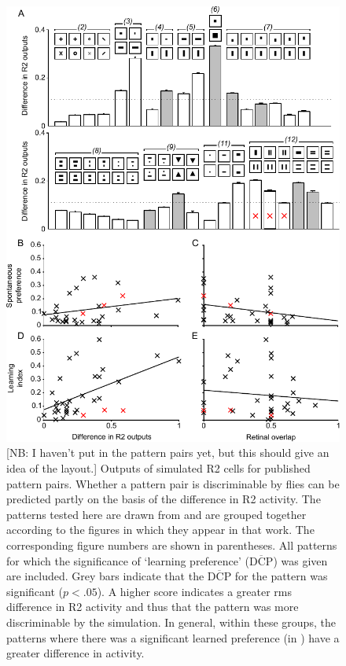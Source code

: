 \begin{figure}
\vspace{-1cm}
\centering
\includegraphics{figures/pattern}
\caption{[NB: I haven't put in the pattern pairs yet, but this should give an idea of the layout.]
Outputs of simulated R2 cells for published pattern pairs. Whether a pattern pair is discriminable by flies can be predicted partly on the basis of the difference in R2 activity.
The patterns tested here are drawn from \protect\cite{Ernst1999} and are grouped together according to the figures in which they appear in that work.
The corresponding figure numbers are shown in parentheses.
All patterns for which the significance of `learning preference' ($\overline{\mathrm{DCP}}$) was given are included.
Grey bars indicate that the $\overline{\mathrm{DCP}}$ for the pattern was significant ($p<.05$).
A higher score indicates a greater \ac{rms} difference in R2 activity and thus that the pattern was more discriminable by the simulation.
In general, within these groups, the patterns where there was a significant learned preference (in \protect\cite{Ernst1999}) have a greater difference in activity.
}
\end{figure}
